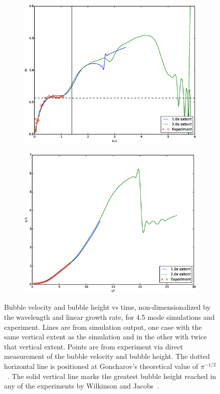 \begin{figure}
\begin{subfigure}[b]{0.5\textwidth}
  \includegraphics[width=\textwidth]{plts/Fr_long}
\end{subfigure}
\begin{subfigure}[b]{0.5\textwidth}
  \includegraphics[width=\textwidth]{plts/aspect_long}
\end{subfigure}
\caption{ 
Bubble velocity and bubble height vs time, non-dimensionalized by the wavelength and linear growth rate, for 4.5 mode simulations and experiment.
Lines are from simulation output, one case with the same vertical extent as the simulation and in the other with twice that vertical extent.
Points are from experiment via direct measurement of the bubble velocity and bubble height.
The dotted horizontal line is positioned at Goncharov's theoretical value of $\pi^{-1/2}$~\cite{Goncharov2002}.
The solid vertical line marks the greatest bubble height reached in any of the experiments by Wilkinson and Jacobs~\cite{Wilkinson2007}.
}
\end{figure}

